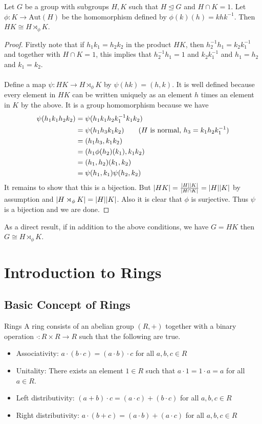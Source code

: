 \documentclass[a4paper]{article}
\begin{document}
\begin{thm}{}{} Let $G$ be a group with subgroups $H,K$ such that $H\trianglelefteq G$ and $H\cap K=1$. Let $\phi:K\to\text{Aut}(H)$ be the homomorphism defined by $\phi(k)(h)=khk^{-1}$. Then $HK\cong H\rtimes_\phi K$. \tcbline
\begin{proof}
Firstly note that if $h_1k_1=h_2k_2$ in the product $HK$, then $h_2^{-1}h_1=k_2k_1^{-1}$ and together with $H\cap K=1$, this implies that $h_2^{-1}h_1=1$ and $k_2k_1^{-1}$ and $h_1=h_2$ and $k_1=k_2$. \\~\\

Define a map $\psi:HK\to H\rtimes_\phi K$ by $\psi(hk)=(h,k)$. It is well defined because every element in $HK$ can be written uniquely as an element $h$ times an element in $K$ by the above. It is a group homomorphism because we have 
\begin{align*}
\psi(h_1k_1h_2k_2)&=\psi(h_1k_1h_2k_1^{-1}k_1k_2)\\
&=\psi(h_1h_3k_1k_2)\tag{$H$ is normal, $h_3=k_1h_2k_1^{-1}$}\\
&=(h_1h_3,k_1k_2)\\
&=(h_1\phi(h_2)(k_1),k_1k_2)\\
&=(h_1,h_2)(k_1,k_2)\\
&=\psi(h_1,k_1)\psi(h_2,k_2)
\end{align*}
It remains to show that this is a bijection. But $\abs{HK}=\frac{\abs{H}\abs{K}}{\abs{H\cap K}}=\abs{H}\abs{K}$ by assumption and $\abs{H\rtimes_\phi K}=\abs{H}\abs{K}$. Also it is clear that $\phi$ is surjective. Thus $\psi$ is a bijection and we are done. 
\end{proof}
\end{thm}

As a direct result, if in addition to the above conditions, we have $G=HK$ then $G\cong H\rtimes_\phi K$. 

\pagebreak
\section{Introduction to Rings}
\subsection{Basic Concept of Rings}
\begin{defn}{Rings}{} A ring consists of an abelian group $(R,+)$ together with a binary operation $\cdot:R\times R\to R$ such that the following are true. 
\begin{itemize}
\item Associativity: $a\cdot(b\cdot c)=(a\cdot b)\cdot c$ for all $a,b,c\in R$
\item Unitality: There exists an element $1\in R$ such that $a\cdot 1=1\cdot a=a$ for all $a\in R$. 
\item Left distributivity: $(a+b)\cdot c=(a\cdot c)+(b\cdot c)$ for all $a,b,c\in R$
\item Right distributivity: $a\cdot(b+c)=(a\cdot b)+(a\cdot c)$ for all $a,b,c\in R$
\end{itemize}
\end{defn}
\end{document}
